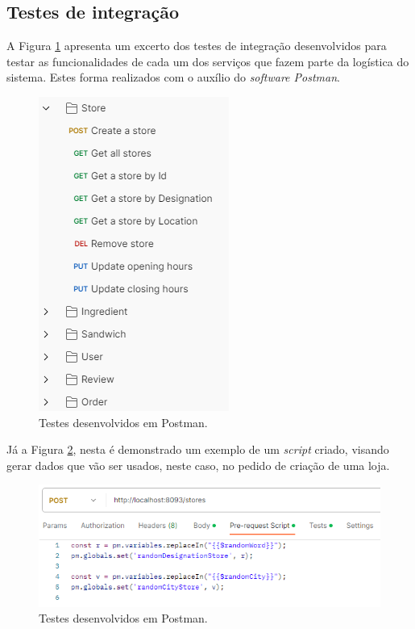 \subsection{Testes de integração}

A Figura \ref{fig:testesPostman} apresenta um excerto dos testes de integração desenvolvidos para testar as funcionalidades de cada um dos serviços que fazem parte da logística do sistema. Estes forma realizados com o auxílio do \textit{software Postman}.

\begin{figure}[H]
	\centering
	\includegraphics[scale=0.8]{figures/testesPostman.png}
	\caption{Testes desenvolvidos em Postman.}
	\label{fig:testesPostman}
\end{figure}

Já a Figura \ref{fig:testesPostman2}, nesta é demonstrado um exemplo de um \textit{script} criado, visando gerar dados que vão ser usados, neste caso, no pedido de criação de uma loja.

\begin{figure}[H]
	\centering
	\includegraphics[scale=0.8]{figures/testesPostman2.png}
	\caption{Testes desenvolvidos em Postman.}
	\label{fig:testesPostman2}
\end{figure}


